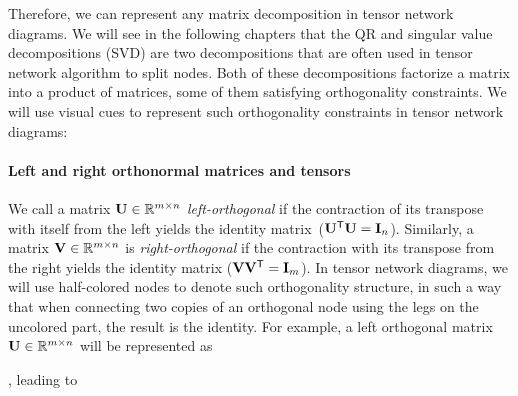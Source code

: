 Therefore, we can represent any matrix decomposition in tensor network diagrams. We will see in the following chapters that the QR and singular value decompositions (SVD) are two decompositions that are often used in tensor network algorithm to split nodes. Both of these decompositions factorize a matrix into a product of matrices, some of them satisfying orthogonality constraints. We will use visual cues to represent such orthogonality constraints in tensor network diagrams:
\paragraph{Left and right orthonormal matrices and tensors}
We call a matrix $\mathbf{U}\in\mathbb{R}^{m\times n}$ \emph{left-orthogonal} if the contraction  of its transpose with itself from  the left yields the identity matrix~($\mathbf{U}^{\mathsf{T}}\mathbf{U} = \mathbf{I}_{n}$).
Similarly, a matrix $\mathbf{V}\in\mathbb{R}^{m\times n}$ is \emph{right-orthogonal} if the contraction with its transpose from the right yields the identity matrix
($\mathbf{V}\mathbf{V}^{\mathsf{T}} = \mathbf{I}_{m}$). In tensor network diagrams, we will use half-colored nodes to denote such orthogonality structure, in such a way that when connecting two copies of an orthogonal node using the legs on the uncolored part, the result is the identity. For example, a left orthogonal matrix $\mathbf{U}\in\mathbb{R}^{m\times n}$ will be represented as 
, leading to 
